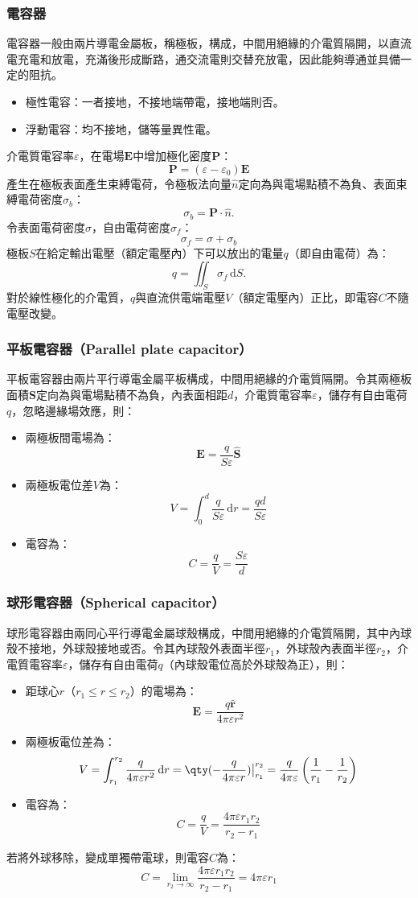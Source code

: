 \documentclass[a4paper,12pt]{report}
\begin{document}
\begin{itemize}
\subsubsection{電容器}
電容器一般由兩片導電金屬板，稱極板，構成，中間用絕緣的介電質隔開，以直流電充電和放電，充滿後形成斷路，通交流電則交替充放電，因此能夠導通並具備一定的阻抗。
\begin{itemize}
\item 極性電容：一者接地，不接地端帶電，接地端則否。
\item 浮動電容：均不接地，儲等量異性電。
\end{itemize}
介電質電容率$\varepsilon$，在電場$\mathbf{E}$中增加極化密度$\mathbf{P}$：
\[\mathbf{P}=(\varepsilon-\varepsilon_0)\mathbf{E}\]
產生在極板表面產生束縛電荷，令極板法向量$\hat{n}$定向為與電場點積不為負、表面束縛電荷密度$\sigma_b$：
\[\sigma_b = \mathbf{P}\cdot\hat{n}.\]
令表面電荷密度$\sigma$，自由電荷密度$\sigma_f$：
\[\sigma_f=\sigma+\sigma_b\]
極板$S$在給定輸出電壓（額定電壓內）下可以放出的電量$q$（即自由電荷）為：
\[q=\iint_S\sigma_f\,\mathrm{d}S.\]
對於線性極化的介電質，$q$與直流供電端電壓$V$（額定電壓內）正比，即電容$C$不隨電壓改變。
\subsubsection{平板電容器（Parallel plate capacitor）}
平板電容器由兩片平行導電金屬平板構成，中間用絕緣的介電質隔開。令其兩極板面積$\mathbf{S}$定向為與電場點積不為負，內表面相距$d$，介電質電容率$\varepsilon$，儲存有自由電荷$q$，忽略邊緣場效應，則：
\begin{itemize}
\item 兩極板間電場為：
\[\mathbf{E}=\frac{q}{S\varepsilon}\hat{\mathbf{S}}\]
\item 兩極板電位差$V$為：
\[V=\int_0^d\frac{q}{S\varepsilon}\,\mathrm{d}r=\frac{qd}{S\varepsilon}\]
\item 電容為：
\[C = \frac{q}{V} = \frac{S\varepsilon}{d}\]
\end{itemize}
\subsubsection{球形電容器（Spherical capacitor）}
球形電容器由兩同心平行導電金屬球殼構成，中間用絕緣的介電質隔開，其中內球殼不接地，外球殼接地或否。令其內球殼外表面半徑$r_1$，外球殼內表面半徑$r_2$，介電質電容率$\varepsilon$，儲存有自由電荷$q$（內球殼電位高於外球殼為正），則：
\begin{itemize}
\item 距球心$r$（$r_1\leq r\leq r_2$）的電場為：
\[\mathbf{E} = \frac{q\hat{\mathbf{r}}}{4\pi\varepsilon r^2}\]
\item 兩極板電位差為：
\[V=\int_{r_1}^{r_2}\frac{q}{4\pi\varepsilon r^2}\,\mathrm{d}r=\qty(-\frac{q}{4\pi\varepsilon r})\big\vert_{r_1}^{r_2}=\frac{q}{4\pi\varepsilon}\left(\frac{1}{r_1}-\frac{1}{r_2}\right)\]
\item 電容為：
\[C = \frac{q}{V}=\frac{4\pi\varepsilon r_1r_2}{r_2-r_1}\]
\end{itemize}
若將外球移除，變成單獨帶電球，則電容$C$為：
\[C = \lim_{r_2\to\infty}\frac{4\pi\varepsilon r_1r_2}{r_2-r_1}=4\pi\varepsilon r_1\]

\end{itemize}
\end{document}
